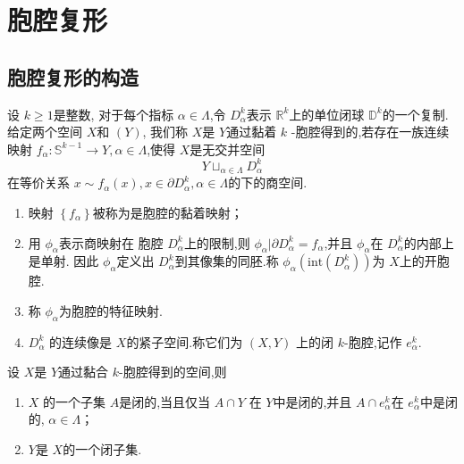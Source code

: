 \documentclass[../../几何与拓扑.tex]{subfiles}
\begin{document}
    
\chapter{胞腔复形}

\section{胞腔复形的构造}

\begin{definition}
    设 \(  k\ge 1  \)是整数, 对于每个指标 \(  \alpha  \in  \Lambda   \),令 \(  D_{\alpha }^{k}  \)表示 \(  \mathbb{R} ^{k}  \)上的单位闭球 \(  \mathbb{D}^{k}  \)的一个复制.给定两个空间 \(  X  \)和 \(  \left( Y \right)   \),
    我们称 \(  X  \)是 \(  Y  \)通过黏着 \(  k  \)  -胞腔得到的,若存在一族连续映射 \(  f_{\alpha }: \mathbb{S}^{k-1}\to Y  ,\alpha  \in  \Lambda \),使得 \(  X  \)是无交并空间 \[
    Y \sqcup _{\alpha  \in  \Lambda }D_{\alpha }^{k}
    \]在等价关系 \(  x\sim f_{\alpha }\left( x \right),x \in \partial D_{\alpha }^{k},\alpha  \in  \Lambda    \)的下的商空间.   
\end{definition}
\begin{remark}
    \begin{enumerate}
        \item 映射 \(  \left\{ f_{\alpha } \right\}  \)被称为是胞腔的黏着映射；
        \item 用 \(  \phi _{\alpha }  \)表示商映射在 胞腔 \(  D_{\alpha }^{k}  \)上的限制,则 \(  \phi _{\alpha }|\partial D_{\alpha }^{k}= f_{\alpha }  \),并且 \(  \phi _{\alpha }  \)在 \(  D_{\alpha }^{k}  \)的内部上是单射.   
        因此 \(  \phi _{\alpha }  \)定义出 \(  D_{\alpha }^{k}  \)到其像集的同胚.称 \(  \phi _{\alpha }\left( \mathrm{int} \left( D_{\alpha }^{k} \right)  \right)   \)为 \(  X  \)上的开胞腔.     
        \item 称 \(  \phi _{\alpha }  \)为胞腔的特征映射. 
        \item \(  D_{\alpha }^{k}  \) 的连续像是 \(  X  \)的紧子空间.称它们为 \(  \left( X,Y \right)   \)  上的闭 \(  k  \)-胞腔,记作 \(  e_{\alpha }^{k}  \).  
    \end{enumerate}
    
\end{remark}

\begin{lemma}
    设 \(  X  \)是 \(  Y  \)通过黏合 \(  k  \)-胞腔得到的空间,则 
    \begin{enumerate}
        \item \(  X  \) 的一个子集 \(  A  \)是闭的,当且仅当 \(  A\cap Y  \)   在 \(  Y  \)中是闭的,并且 \(  A\cap e_{\alpha }^{k}  \)在 \(  e_{\alpha }^{k}  \)中是闭的, \(  \alpha \in  \Lambda   \)；
        \item \(  Y  \)是 \(  X  \)的一个闭子集.      
    \end{enumerate}
       
\end{lemma}
\end{document}
